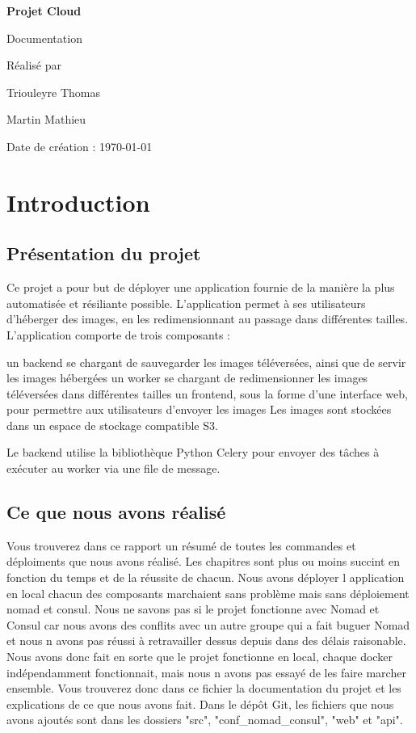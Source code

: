 \documentclass{report}
\begin{document}
\begin{titlepage}
    \centering
    \vspace*{2cm}
    {\Huge\bfseries Projet Cloud\par Documentation}
    \vspace{1cm}
    \vfill
    Réalisé par\par
    Triouleyre Thomas\par
    Martin Mathieu

    \vfill

    {\large Date de création : \today\par}
\end{titlepage}

\tableofcontents

\chapter{Introduction}
\section{Présentation du projet}
Ce projet a pour but de déployer une application fournie de la manière la plus automatisée et résiliante possible. L’application permet à ses utilisateurs d’héberger des images, en les redimensionnant au passage dans différentes tailles.
L’application comporte de trois composants :

un backend se chargant de sauvegarder les images téléversées, ainsi que de servir les images hébergées
un worker se chargant de redimensionner les images téléversées dans différentes tailles
un frontend, sous la forme d’une interface web, pour permettre aux utilisateurs d’envoyer les images
Les images sont stockées dans un espace de stockage compatible S3.

Le backend utilise la bibliothèque Python Celery pour envoyer des tâches à exécuter au worker via une file de message.

\section{Ce que nous avons réalisé}
Vous trouverez dans ce rapport un résumé de toutes les commandes et déploiments que nous avons réalisé. Les chapitres sont plus ou moins succint en fonction du temps et de la réussite de chacun.
Nous avons déployer l application en local chacun des composants marchaient sans problème mais sans déploiement nomad et consul.
Nous ne savons pas si le projet fonctionne avec Nomad et Consul car nous avons des conflits avec un autre groupe qui a fait buguer Nomad et nous n avons pas réussi à retravailler dessus depuis dans des délais raisonable. Nous avons donc fait en sorte que le projet fonctionne en local, chaque docker indépendamment fonctionnait, mais nous n avons pas essayé de les faire marcher ensemble. Vous trouverez donc dans ce fichier la documentation du projet et les explications de ce que nous avons fait. Dans le dépôt Git, les fichiers que nous avons ajoutés sont dans les dossiers "src", "conf\_nomad\_consul", "web" et "api".
\end{document}
